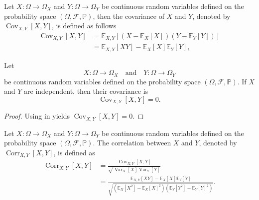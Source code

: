 \begin{definition}[Covariance]
	\label{def:covariance}
	Let $X\colon \Omega \to \Omega_X$ and $Y\colon \Omega \to \Omega_Y$ be continuous random variables defined on the probability space $(\Omega, \mathcal{F}, \mathbb{P})$, then the covariance of $X$ and $Y$, denoted by $\operatorname{Cov}_{X,Y}[X,Y]$, is defined as follows
	\begin{equation}
		\begin{split}
			\operatorname{Cov}_{X,Y}[X,Y]&=\mathbb{E}_{X,Y}[(X-\mathbb{E}_X[X])(Y-\mathbb{E}_Y[Y])]\\
			&=\mathbb{E}_{X,Y}[XY]-\mathbb{E}_X[X]\mathbb{E}_Y[Y],
		\end{split}
	\end{equation}
\end{definition}
\begin{theorem}
	\label{theorem:covariance_of_independent_variables}
	Let 
	\begin{equation}
		X\colon \Omega \to \Omega_X \quad \text{and}\quad Y\colon \Omega \to \Omega_Y
	\end{equation}
	 be continuous random variables defined on the probability space $(\Omega, \mathcal{F}, \mathbb{P})$. If $X$ and $Y$ are independent, then their covariance is
	\begin{equation}
		\operatorname{Cov}_{X,Y}[X,Y] = 0.
	\end{equation}
\end{theorem}
\begin{proof}
	Using  in  yields $\operatorname{Cov}_{X,Y}[X,Y]=0$.
\end{proof}

\begin{definition}[Correlation]
	\label{def:correlation}
	Let $X\colon \Omega \to \Omega_X$ and $Y\colon \Omega \to \Omega_Y$ be continuous random variables defined on the probability space $(\Omega, \mathcal{F}, \mathbb{P})$. The correlation between $X$ and $Y$, denoted by $\operatorname{Corr}_{X,Y}[X,Y]$, is defined as
	\begin{equation}
		\begin{split}
			\operatorname{Corr}_{X,Y}[X,Y] &= \frac{\operatorname{Cov}_{X,Y}[X,Y]}{\sqrt{\operatorname{Var}_X[X]  \operatorname{Var}_Y[Y]}} \\
			&= \frac{\mathbb{E}_{X,Y}[XY]-\mathbb{E}_X[X]\mathbb{E}_Y[Y]}{\sqrt{\left(\mathbb{E}_X[X^2] - \mathbb{E}_X[X]^2\right) \left(\mathbb{E}_Y[Y^2] - \mathbb{E}_Y[Y]^2\right)}}.
		\end{split}
	\end{equation}
\end{definition}

